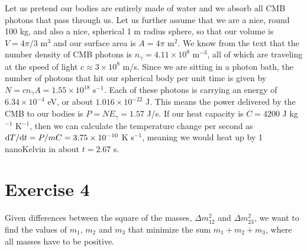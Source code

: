 \documentclass[12pt,a4paper]{article}
\newcommand\TM[1]{\todo[color=green!40, inline, size=\small]{TM: #1}}
\begin{document}
Let us pretend our bodies are entirely made of water and we absorb all CMB photons that pass through us. Let us further assume that we are a nice, round 100 kg, and also a nice, spherical 1 m radius sphere, so that our volume is $V=4\pi/3$ m$^{3}$ and our surface area is $A=4\pi$ m$^{2}$. We know from the text that the number density of CMB photons is $n_\gamma = 4.11\times 10^{8}$ m$^{-3}$, all of which are traveling at the speed of light $c\approx 3\times 10^8$ m/s. Since we are sitting in a photon bath, the number of photons that hit our spherical body per unit time is given by $N = cn_\gamma A = 1.55\times 10^{18}$ s$^{-1}$. Each of these photons is carrying an energy of $6.34\times10^{-4}$ eV, or about $1.016\times10^{-22}$ J. This means the power delivered by the CMB to our bodies is $P = NE_\gamma = 1.57$ J/s. If our heat capacity is $C = 4200$ J kg$^{-1}$ K$^{-1}$, then we can calculate the temperature change per second as ${\rm d}T/{\rm d}t = P/mC = 3.75\times 10^{-10}$ K s$^{-1}$, meaning we would heat up by 1 nanoKelvin in about $t= 2.67$ s.

\section{Exercise 4}
\label{sec:ex4}

Given differences between the square of the masses, $\Delta m^2_{12}$ and $\Delta m^2_{23}$, we want to find the values of $m_1$, $m_2$ and $m_3$ that minimize the sum $m_1+m_2+m_3$, where all masses have to be positive. \TM{Finish this.}
\end{document}
